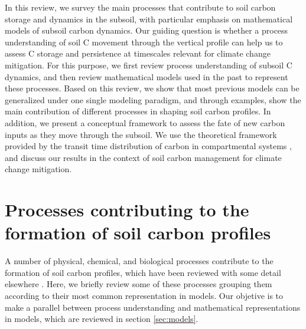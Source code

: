 \documentclass[11pt, oneside, a4paper]{article}   	%
\begin{document}
In this review, we survey the main processes that contribute to soil carbon storage and dynamics in the subsoil, with particular emphasis on mathematical models of subsoil carbon dynamics. 
Our guiding question is whether a process understanding of soil C movement through the vertical profile can help us to assess C storage and persistence at timescales relevant for climate change mitigation. 
For this purpose, we first review process understanding of subsoil C dynamics, and then review mathematical models used in the past to represent these processes. Based on this review, we show that most previous models can be generalized under one single modeling paradigm, and through examples, show the main contribution of different processes in shaping soil carbon profiles. 
In addition, we present a conceptual framework to assess the fate of new carbon inputs as they move through the subsoil. We use the theoretical framework provided by the transit time distribution of carbon in compartmental systems \citep{Sierra2017GCB, Sierra2018GBC, Metzler2018MG}, and discuss our results in the context of  soil carbon management for climate change mitigation.

\section{Processes contributing to the formation of soil carbon profiles}
A number of physical, chemical, and biological processes contribute to the formation of soil carbon profiles, which have been reviewed with some detail elsewhere \citep[e.g.][]{Button2022,HicksPries2023}. Here, we briefly review some of these processes grouping them according to their most common representation in models. Our objetive is to make a parallel between process understanding and mathematical representations in models, which are reviewed in section \ref{sec:models}.
\end{document}
